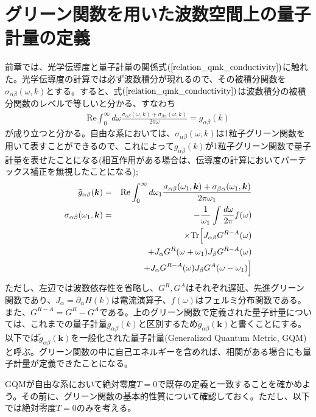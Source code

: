 \documentclass[12pt]{jsbook}
\newcommand{\pa}{\partial}
\newcommand{\bk}{\bm{k}}
\begin{document}
\section{グリーン関数を用いた波数空間上の量子計量の定義}
前章では、光学伝導度と量子計量の関係式$(\ref{relation_qmk_conductivity})$に触れた。光学伝導度の計算では必ず波数積分が現れるので、その被積分関数を$\sigma_{\alpha\beta}(\omega,k)$とする。すると、式$(\ref{relation_qmk_conductivity})$は波数積分の被積分関数のレベルで等しいと分かる、すなわち
\begin{eqnarray}
    \mathrm{Re} \int_0^{\infty}d\omega \frac{\sigma_{\alpha\beta}(\omega,k)+\sigma_{\beta\alpha}(\omega,k)}{2\pi\omega}=g_{\alpha\beta}(k)
\end{eqnarray}
が成り立つと分かる。自由な系においては、$\sigma_{\alpha\beta}(\omega,k)$は1粒子グリーン関数を用いて表すことができる\cite{michishita2021effects}ので、これによって$g_{\alpha\beta}(k)$が1粒子グリーン関数で量子計量を表せたことになる(相互作用がある場合は、伝導度の計算においてバーテックス補正を無視したことになる);
\begin{eqnarray}
\label{defGQM}\tilde{g}_{\alpha\beta}(\bk)&=&\mathrm{Re}\int_0^{\infty} d\omega_1 \frac{\sigma_{\alpha\beta}(\omega_1,\bk) + \sigma_{\beta{\alpha}}(\omega_1,\bk)}{2\pi\omega_1}\\
\label{optk}\sigma_{\alpha\beta}(\omega_1,\bk)&=&-\frac{1}{\omega_1}\int \frac{d\omega}{2\pi}f(\omega)\nonumber\\
&&\times \mathrm{Tr}\Bigl[J_{\alpha\beta}G^{R-A}(\omega)\nonumber\\
&& \ \ \ \ \ \ +J_\alpha G^R(\omega+\omega_1)J_\beta G^{R-A}(\omega)\nonumber\\ 
&& \ \ \ \ \ \ +J_\alpha G^{R-A}(\omega)J_\beta G^A(\omega-\omega_1)\Bigr]
\end{eqnarray}
ただし、左辺では波数依存性を省略し、$G^R,G^A$はそれぞれ遅延、先進グリーン関数であり、$J_\alpha=\pa_{\alpha} H(k)$は電流演算子、$f(\omega)$はフェルミ分布関数である。また、$G^{R-A}=G^R-G^A$である。上のグリーン関数で定義された量子計量については、これまでの量子計量$g_{\alpha\beta}(k)$と区別するため$\tilde{g}_{\alpha\beta}(\bk)$と書くことにする。以下では$\tilde{g}_{\alpha\beta}(\bk)$を一般化された量子計量(Generalized Quantum Metric, GQM)と呼ぶ。グリーン関数の中に自己エネルギーを含めれば、相関がある場合にも量子計量が定義できたことになる。

GQMが自由な系において絶対零度$T=0$で既存の定義と一致することを確かめよう。その前に、グリーン関数の基本的性質について確認しておく。ただし、以下では絶対零度$T=0$のみを考える。
\end{document}
